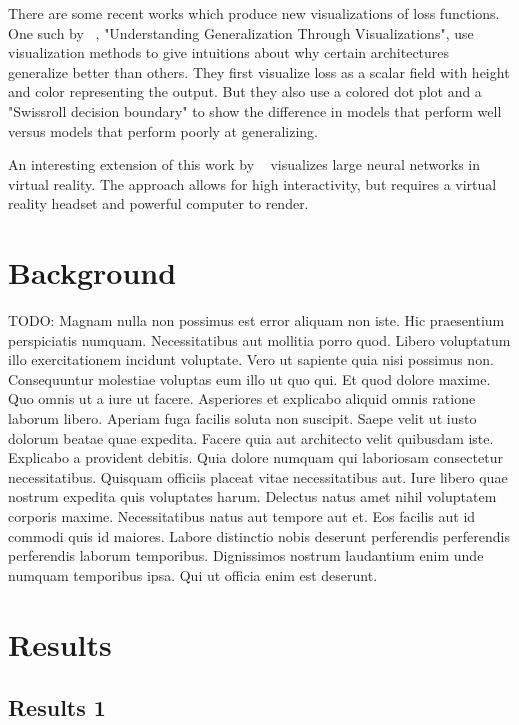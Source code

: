 \documentclass{acmsiggraph}
\begin{document}
There are some recent works which produce new visualizations of loss functions. One such by ~\cite{pmlr-v137-huang20a}, "Understanding Generalization Through Visualizations", use
visualization methods to give intuitions about why certain architectures generalize better than others. They first visualize loss as a scalar field with height and color representing the output. But they also use a colored dot plot and a "Swissroll decision boundary" to show the difference in models that perform well versus models that perform poorly at generalizing.

An interesting extension of this work by ~\cite{linse2022walk} visualizes large neural networks in virtual reality. The approach allows for high interactivity, but requires a virtual reality headset and powerful computer to render.


\section{Background}
\label{sec:intro}

TODO:
Magnam nulla non possimus est error aliquam non iste. Hic praesentium perspiciatis numquam. Necessitatibus aut mollitia porro quod. Libero voluptatum illo exercitationem incidunt voluptate. Vero ut sapiente quia nisi possimus non. Consequuntur molestiae voluptas eum illo ut quo qui.
Et quod dolore maxime. Quo omnis ut a iure ut facere. Asperiores et explicabo aliquid omnis ratione laborum libero. Aperiam fuga facilis soluta non suscipit.
Saepe velit ut iusto dolorum beatae quae expedita. Facere quia aut architecto velit quibusdam iste. Explicabo a provident debitis. Quia dolore numquam qui laboriosam consectetur necessitatibus.
Quisquam officiis placeat vitae necessitatibus aut. Iure libero quae nostrum expedita quis voluptates harum. Delectus natus amet nihil voluptatem corporis maxime. Necessitatibus natus aut tempore aut et.
Eos facilis aut id commodi quis id maiores. Labore distinctio nobis deserunt perferendis perferendis perferendis laborum temporibus. Dignissimos nostrum laudantium enim unde numquam temporibus ipsa. Qui ut officia enim est deserunt.


\section{Results}
\label{sec:intro}

\subsection{Results 1}
\label{sec:separatrices}
\end{document}
